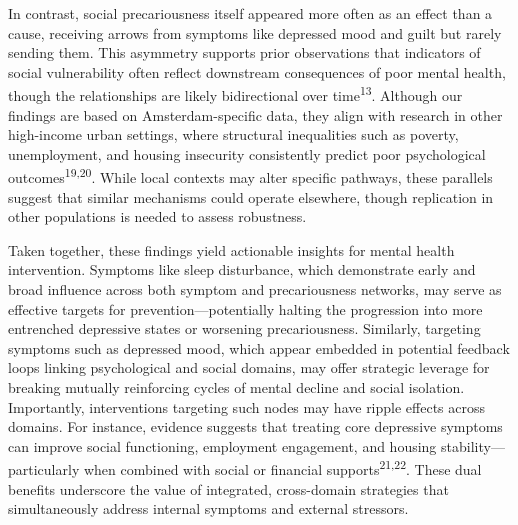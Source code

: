 \documentclass[
]{article}
\begin{document}
In contrast, social precariousness itself appeared more often as an
effect than a cause, receiving arrows from symptoms like depressed mood
and guilt but rarely sending them. This asymmetry supports prior
observations that indicators of social vulnerability often reflect
downstream consequences of poor mental health, though the relationships
are likely bidirectional over time\textsuperscript{13}. Although our
findings are based on Amsterdam-specific data, they align with research
in other high-income urban settings, where structural inequalities such
as poverty, unemployment, and housing insecurity consistently predict
poor psychological outcomes\textsuperscript{19,20}. While local contexts
may alter specific pathways, these parallels suggest that similar
mechanisms could operate elsewhere, though replication in other
populations is needed to assess robustness.

Taken together, these findings yield actionable insights for mental
health intervention. Symptoms like sleep disturbance, which demonstrate
early and broad influence across both symptom and precariousness
networks, may serve as effective targets for prevention---potentially
halting the progression into more entrenched depressive states or
worsening precariousness. Similarly, targeting symptoms such as
depressed mood, which appear embedded in potential feedback loops
linking psychological and social domains, may offer strategic leverage
for breaking mutually reinforcing cycles of mental decline and social
isolation. Importantly, interventions targeting such nodes may have
ripple effects across domains. For instance, evidence suggests that
treating core depressive symptoms can improve social functioning,
employment engagement, and housing stability---particularly when
combined with social or financial supports\textsuperscript{21,22}. These
dual benefits underscore the value of integrated, cross-domain
strategies that simultaneously address internal symptoms and external
stressors.
\end{document}
